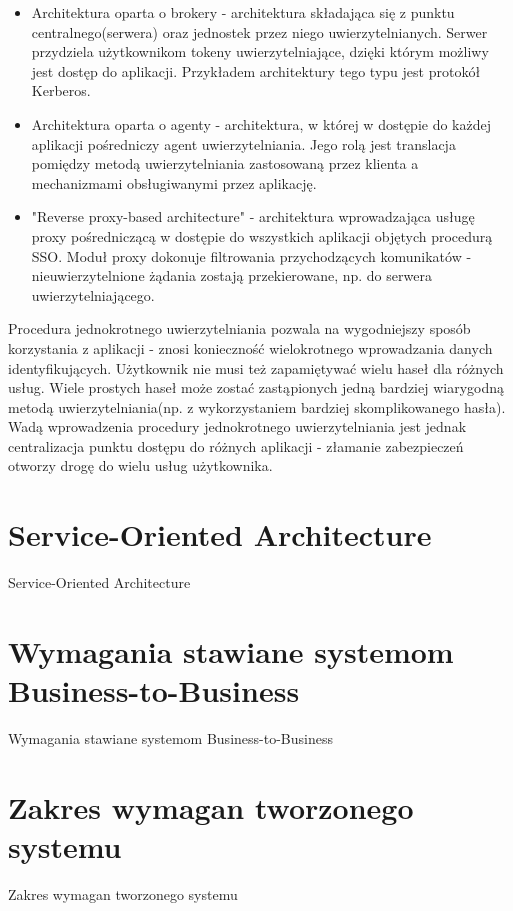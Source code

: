 \begin{itemize}
  \item Architektura oparta o brokery - architektura składająca się z punktu centralnego(serwera) oraz jednostek przez niego uwierzytelnianych. Serwer przydziela użytkownikom tokeny uwierzytelniające, dzięki którym możliwy jest dostęp do aplikacji. Przykładem architektury tego typu jest protokół Kerberos. 
  \item Architektura oparta o agenty - architektura, w której w dostępie do każdej aplikacji pośredniczy agent uwierzytelniania. Jego rolą jest translacja pomiędzy metodą uwierzytelniania zastosowaną przez klienta a mechanizmami obsługiwanymi przez aplikację.
  \item "Reverse proxy-based architecture" - architektura wprowadzająca usługę proxy pośredniczącą w dostępie do wszystkich aplikacji objętych procedurą SSO. Moduł proxy dokonuje filtrowania przychodzących komunikatów - nieuwierzytelnione żądania zostają przekierowane, np. do serwera uwierzytelniającego.
\end{itemize}
  
Procedura jednokrotnego uwierzytelniania pozwala na wygodniejszy sposób korzystania z aplikacji - znosi konieczność wielokrotnego wprowadzania danych identyfikujących. Użytkownik nie musi też zapamiętywać wielu haseł dla różnych usług. Wiele prostych haseł może zostać zastąpionych jedną bardziej wiarygodną metodą uwierzytelniania(np. z wykorzystaniem bardziej skomplikowanego hasła). Wadą wprowadzenia procedury jednokrotnego uwierzytelniania jest jednak centralizacja punktu dostępu do różnych aplikacji - złamanie zabezpieczeń otworzy drogę do wielu usług użytkownika.


\section{Service-Oriented Architecture}
\label{sec:soa}

Service-Oriented Architecture


\section{Wymagania stawiane systemom Business-to-Business}
\label{sec:wymaganiaB2B}

Wymagania stawiane systemom Business-to-Business


\section{Zakres wymagan tworzonego systemu}
\label{sec:zakresWymagan}

Zakres wymagan tworzonego systemu

